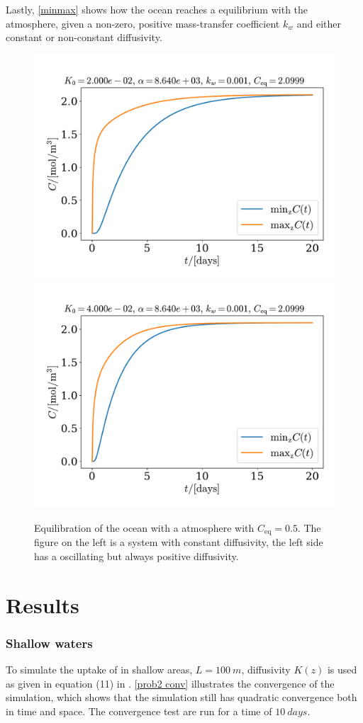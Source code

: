 \documentclass{article}
\begin{document}
    Lastly, \autoref{minmax} shows how the ocean reaches a equilibrium with the atmosphere, given a non-zero, positive mass-transfer coefficient $k_w$ and either constant or non-constant diffusivity.

    \begin{figure}
        \centering
        \includegraphics[width=.49\textwidth]{../plots/test5_minmax}
        \includegraphics[width=.49\textwidth]{../plots/test5_varK_minmax}
        \caption{Equilibration of the ocean with a atmosphere with $C_\mathrm{eq}=0.5$. The figure on the left is a system with constant diffusivity, the left side has a oscillating but always positive diffusivity.}
        \label{minmax}
    \end{figure}

    \section*{Results}
    \subsubsection*{Shallow waters}
    To simulate the uptake of  in shallow areas, $L=\SI{100}{m}$, diffusivity $K(z)$ is used as given in equation (11) in \cite{exercise}. \autoref{prob2 conv} illustrates the convergence of the simulation, which shows that the simulation still has quadratic convergence both in time and space. The convergence test are run for a time of $\SI{10}{days}$.
\end{document}
